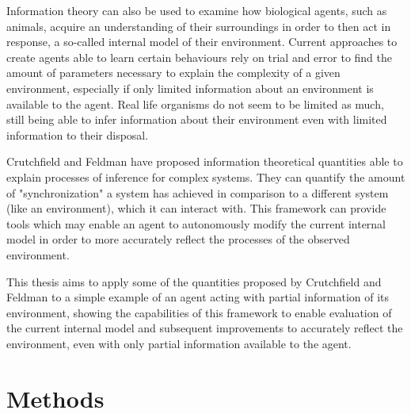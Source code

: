 \documentclass[12pt,a4paper]{article}
\begin{document}
Information theory can also be used to examine how biological agents, such as animals, acquire an understanding of their surroundings in order to then act in response, a so-called internal model of their environment. Current approaches to create agents able to learn certain behaviours rely on trial and error to find the amount of parameters necessary to explain the complexity of a given environment, especially if only limited information about an environment is available to the agent. Real life organisms do not seem to be limited as much, still being able to infer information about their environment even with limited information to their disposal.

Crutchfield and Feldman \autocite{crutchfield2003regularities} have proposed information theoretical quantities able to explain processes of inference for complex systems. They can quantify the amount of "synchronization" a system has achieved in comparison to a different system (like an environment), which it can interact with. This framework can provide tools which may enable an agent to autonomously modify the current internal model in order to more accurately reflect the processes of the observed environment.

This thesis aims to apply some of the quantities proposed by Crutchfield and Feldman to a simple example of an agent acting with partial information of its environment, showing the capabilities of this framework to enable evaluation of the current internal model and subsequent improvements to accurately reflect the environment, even with only partial information available to the agent.


\newpage
\section{Methods} \label{sec:methods}
\end{document}
